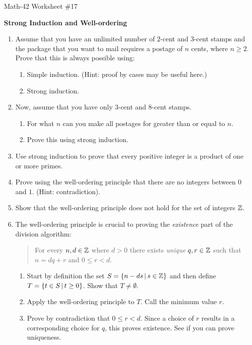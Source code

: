 \documentclass[letterpaper,12pt,fleqn]{article}
\begin{document}
\begin{center}
  \large Math-42 Worksheet \#17

  \textbf{Strong Induction and Well-ordering}
\end{center}

\vspace{0.5in}

\begin{enumerate}[left=0in,itemsep=0.5in]
\item Assume that you have an unlimited number of \(2\)-cent and \(3\)-cent stamps and the package that you want to
  mail requires a postage of \(n\) cents, where \(n\ge2\).  Prove that this is always possible using:
  \begin{enumerate}
  \item Simple induction.  (Hint: proof by cases may be useful here.)
  \item Strong induction.
  \end{enumerate}

\item Now, assume that you have only \(3\)-cent and \(8\)-cent stamps.
  \begin{enumerate}
  \item For what \(n\) can you make all postages for greater than or equal to \(n\).
  \item Prove this using strong induction.
  \end{enumerate}

\item Use strong induction to prove that every positive integer is a product of one or more primes.

\item Prove using the well-ordering principle that there are no integers between \(0\) and \(1\).  (Hint:
  contradiction).

\item Show that the well-ordering principle does not hold for the set of integers \(\mathbb{Z}\).

\item The well-ordering principle is crucial to proving the \emph{existence} part of the division algorithm:

  \begin{quote}
    For every \(n,d\in\mathbb{Z}\) where \(d>0\) there exists \emph{unique} \(q,r\in\mathbb{Z}\) such that \(n=dq+r\) and
    \(0\le r<d\).
  \end{quote}

  \begin{enumerate}
  \item Start by definition the set \(S=\left\{{n-ds}\,\middle|\,{s\in\mathbb{Z}}\right\}\) and then define \(T=\left\{{t\in S}\,\middle|\,{t\ge0}\right\}\).  Show
    that \(T\ne\emptyset\).
  \item Apply the well-ordering principle to \(T\).  Call the minimum value \(r\).
  \item Prove by contradiction that \(0\le r<d\).  Since a choice of \(r\) results in a corresponding choice for
    \(q\), this proves existence. See if you can prove uniqueness.
  \end{enumerate}
\end{enumerate}
\end{document}
